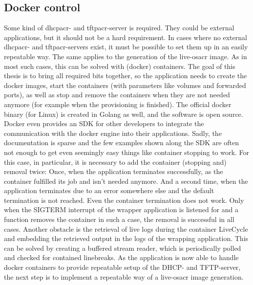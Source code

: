 \subsection{Docker control}
Some kind of \gls{dhcpacr}- and \gls{tftpacr}-server is required. They could be external applications, but it should not be a hard requirement. In cases where no external \gls{dhcpacr}- and \gls{tftpacr}-servers exist, it must be possible to set them up in an easily repeatable way. The same applies to the generation of the live-\gls{osacr} image. As in most such cases, this can be solved with (docker) containers. The goal of this thesis is to bring all required bits together, so the application needs to create the docker images, start the containers (with parameters like volumes and forwarded ports), as well as stop and remove the containers when they are not needed anymore (for example when the provisioning is finished).
\newline
The official docker binary (for Linux) is created in Golang as well, and the software is open source. Docker even provides an SDK for other developers to integrate the communication with the docker engine into their applications.
Sadly, the documentation is sparse and the few examples shown along the SDK are often not enough to get even seemingly easy things like container stopping to work. For this case, in particular, it is necessary to add the container (stopping and) removal twice: Once, when the application terminates successfully, as the container fulfilled its job and isn't needed anymore. And a second time, when the application terminates due to an error somewhere else and the default termination is not reached. Even  the container termination does not work. Only when the SIGTERM interrupt of the wrapper application is  listened for and a function removes the container in such a case, the removal is successful in all cases.
\newline
Another obstacle is the retrieval of live logs during the container LiveCycle and embedding the retrieved output in the logs of the wrapping application. This can be solved by creating a buffered stream reader, which is periodically polled and checked for contained linebreaks.
\newline
As the application is now able to handle docker containers to provide repeatable setup of the DHCP- and TFTP-server, the next step is to implement a repeatable way of a live-\gls{osacr} image generation.

